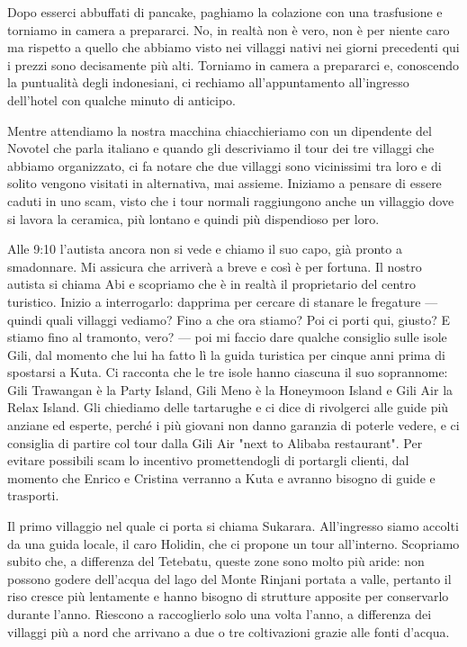 Dopo esserci abbuffati di pancake, paghiamo la colazione con una trasfusione e torniamo in camera a prepararci. No, in realtà non è vero, non è per niente caro ma rispetto a quello che abbiamo visto nei villaggi nativi nei giorni precedenti qui i prezzi sono decisamente più alti. Torniamo in camera a prepararci e, conoscendo la puntualità degli indonesiani, ci rechiamo all'appuntamento all'ingresso dell'hotel con qualche minuto di anticipo.

Mentre attendiamo la nostra macchina chiacchieriamo con un dipendente del Novotel che parla italiano e quando gli descriviamo il tour dei tre villaggi che abbiamo organizzato, ci fa notare che due villaggi sono vicinissimi tra loro e di solito vengono visitati in alternativa, mai assieme. Iniziamo a pensare di essere caduti in uno scam, visto che i tour normali raggiungono anche un villaggio dove si lavora la ceramica, più lontano e quindi più dispendioso per loro.

Alle 9:10 l'autista ancora non si vede e chiamo il suo capo, già pronto a smadonnare. Mi assicura che arriverà a breve e così è per fortuna. Il nostro autista si chiama Abi e scopriamo che è in realtà il proprietario del centro turistico. Inizio a interrogarlo: dapprima per cercare di stanare le fregature — quindi quali villaggi vediamo? Fino a che ora stiamo? Poi ci porti qui, giusto? E stiamo fino al tramonto, vero? — poi mi faccio dare qualche consiglio sulle isole Gili, dal momento che lui ha fatto lì la guida turistica per cinque anni prima di spostarsi a Kuta. Ci racconta che le tre isole hanno ciascuna il suo soprannome: Gili Trawangan è la Party Island, Gili Meno è la Honeymoon Island e Gili Air la Relax Island. Gli chiediamo delle tartarughe e ci dice di rivolgerci alle guide più anziane ed esperte, perché i più giovani non danno garanzia di poterle vedere, e ci consiglia di partire col tour dalla Gili Air "next to Alibaba restaurant". Per evitare possibili scam lo incentivo promettendogli di portargli clienti, dal momento che Enrico e Cristina verranno a Kuta e avranno bisogno di guide e trasporti.

Il primo villaggio nel quale ci porta si chiama Sukarara. All'ingresso siamo accolti da una guida locale, il caro Holidin, che ci propone un tour all'interno. Scopriamo subito che, a differenza del Tetebatu, queste zone sono molto più aride: non possono godere dell'acqua del lago del Monte Rinjani portata a valle, pertanto il riso cresce più lentamente e hanno bisogno di strutture apposite per conservarlo durante l'anno. Riescono a raccoglierlo solo una volta l'anno, a differenza dei villaggi più a nord che arrivano a due o tre coltivazioni grazie alle fonti d'acqua.

